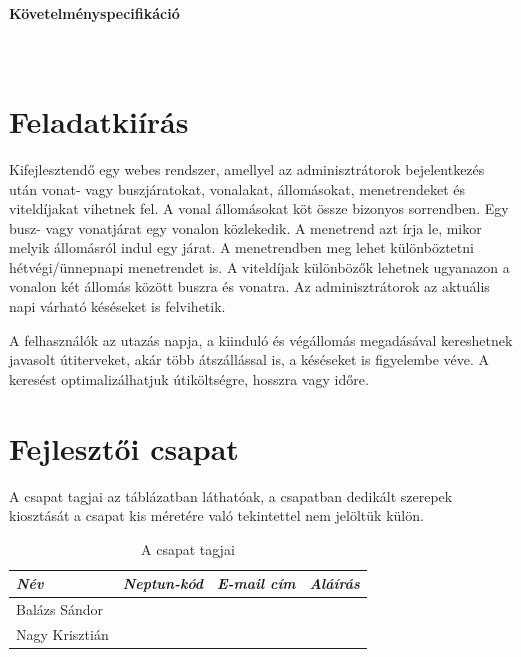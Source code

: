 \thispagestyle{empty}

\begin{center}
  \vspace{0.3cm}
  {\Large \bfseries Követelményspecifikáció}\\[0.8cm]
  {\Large \textbf{\doctitle}}\\
  \vspace{0.2cm}
  {\Large \textmd{\doctype}}\\
\end{center}

\section*{Feladatkiírás}
Kifejlesztendő egy webes rendszer, amellyel az adminisztrátorok bejelentkezés
után vonat- vagy buszjáratokat, vonalakat, állomásokat, menetrendeket és
viteldíjakat vihetnek fel. A vonal állomásokat köt össze bizonyos sorrendben.
Egy busz- vagy vonatjárat egy vonalon közlekedik. A menetrend azt írja le,
mikor melyik állomásról indul egy járat. A menetrendben meg lehet különböztetni
hétvégi/ünnepnapi menetrendet is. A viteldíjak különbözők lehetnek ugyanazon a
vonalon két állomás között buszra és vonatra. Az adminisztrátorok az aktuális
napi várható késéseket is felvihetik.

A felhasználók az utazás napja, a kiinduló és végállomás megadásával kereshetnek
javasolt útiterveket, akár több átszállással is, a késéseket is figyelembe véve.
A keresést optimalizálhatjuk útiköltségre, hosszra vagy időre.

\section*{Fejlesztői csapat}
A csapat tagjai az  táblázatban láthatóak, a csapatban dedikált
szerepek kiosztását a csapat kis méretére való tekintettel nem jelöltük külön.

\begin{table}[ht]
\footnotesize
\centering
\begin{tabular}{llp{4cm}p{4cm}}
\toprule
\emph{Név} & \emph{Neptun-kód} & \emph{E-mail cím} & \emph{Aláírás}\\
\midrule
Balázs Sándor  & & & \\
Nagy Krisztián & & & \\
\bottomrule
\hline
\end{tabular}
\caption{A csapat tagjai}
\label{tab:team}
\end{table}

